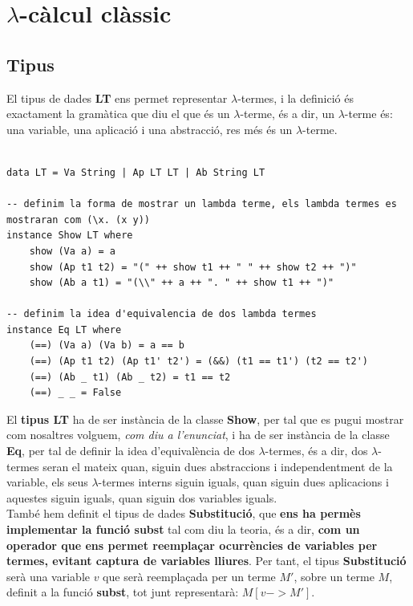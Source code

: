 \documentclass[10pt,a4paper]{article}
\begin{document}
\tableofcontents

\clearpage

\section{$\lambda$-càlcul clàssic}

\subsection{Tipus}

El tipus de dades \textbf{LT} ens permet representar $\lambda$-termes, i la definició és exactament la gramàtica que diu el que és un $\lambda$-terme, és a dir, un $\lambda$-terme és: una variable, una aplicació i una abstracció, res més és un $\lambda$-terme.

\lstset{language=Haskell, breaklines=true, basicstyle=\footnotesize}
\begin{lstlisting}[frame=mystyle]

data LT = Va String | Ap LT LT | Ab String LT

-- definim la forma de mostrar un lambda terme, els lambda termes es mostraran com (\x. (x y))
instance Show LT where
    show (Va a) = a
    show (Ap t1 t2) = "(" ++ show t1 ++ " " ++ show t2 ++ ")"
    show (Ab a t1) = "(\\" ++ a ++ ". " ++ show t1 ++ ")"

-- definim la idea d'equivalencia de dos lambda termes
instance Eq LT where
    (==) (Va a) (Va b) = a == b
    (==) (Ap t1 t2) (Ap t1' t2') = (&&) (t1 == t1') (t2 == t2')
    (==) (Ab _ t1) (Ab _ t2) = t1 == t2
    (==) _ _ = False
\end{lstlisting}

El \textbf{tipus LT} ha de ser instància de la classe \textbf{Show}, per tal que es pugui mostrar com nosaltres volguem, \textit{com diu a l'enunciat}, i ha de ser instància de la classe \textbf{Eq}, per tal de definir la idea d'equivalència de dos $\lambda$-termes, és a dir, dos $\lambda$-termes seran el mateix quan, siguin dues abstraccions i independentment de la variable, els seus $\lambda$-termes interns siguin iguals, quan siguin dues aplicacions i aquestes siguin iguals, quan siguin dos variables iguals. \\

També hem definit el tipus de dades \textbf{Substitució}, que \textbf{ens ha permès implementar la funció subst} tal com diu la teoria, és a dir, \textbf{com un operador que ens permet reemplaçar ocurrències de variables per termes, evitant captura de variables lliures}. Per tant, el tipus \textbf{Substitució} serà una variable $v$ que serà reemplaçada per un terme $M'$, sobre un terme $M$, definit a la funció \textbf{subst}, tot junt representarà: $M [v -> M']$.
\end{document}

